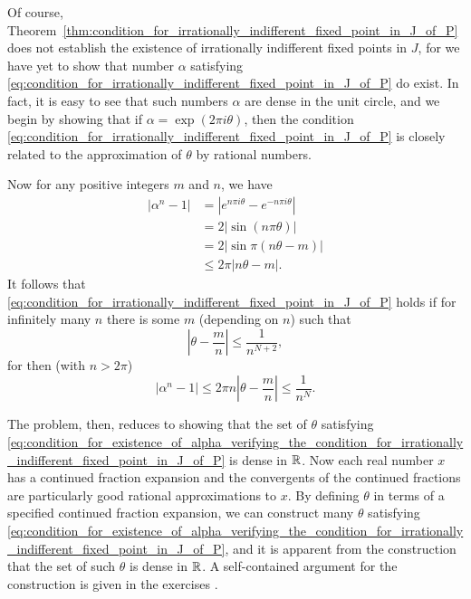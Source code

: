 \begin{remark}
    Of course,
    Theorem~\ref{thm:condition_for_irrationally_indifferent_fixed_point_in_J_of_P}
    does not establish the existence of irrationally indifferent fixed points in
    $J$, for we have yet to show that number $\alpha$ satisfying
    \eqref{eq:condition_for_irrationally_indifferent_fixed_point_in_J_of_P} do
    exist. In fact, it is easy to see that such numbers $\alpha$ are dense in the
    unit circle, and we begin by showing that if $\alpha = \exp(2\pi i \theta)$,
    then the condition
    \eqref{eq:condition_for_irrationally_indifferent_fixed_point_in_J_of_P} is
    closely related to the approximation of $\theta$ by rational numbers.

    Now for any positive integers $m$ and $n$, we have
    \begin{align*}
        |\alpha^n - 1| &= |e^{n\pi i \theta} - e^{-n\pi i \theta}| \\
                    &= 2|\sin(n\pi\theta)| \\
                    &= 2|\sin\pi(n\theta - m)| \\
                    &\leq 2\pi |n\theta - m|.
    \end{align*}
    It follows that
    \eqref{eq:condition_for_irrationally_indifferent_fixed_point_in_J_of_P}
    holds if for infinitely many $n$ there is some $m$ (depending on $n$) such
    that
    \begin{equation}
        \label{eq:condition_for_existence_of_alpha_verifying_the_condition_for_irrationally_indifferent_fixed_point_in_J_of_P}
        \left|\theta - \frac{m}{n}\right| \leq \frac{1}{n^{N+2}},
    \end{equation}
    for then (with $n > 2\pi$)
    \begin{equation*}
        |\alpha^n - 1| \leq 2\pi n \left|\theta - \frac{m}{n}\right| \leq \frac{1}{n^{N}}.
    \end{equation*}

    The problem, then, reduces to showing that the set of $\theta$ satisfying
    \eqref{eq:condition_for_existence_of_alpha_verifying_the_condition_for_irrationally_indifferent_fixed_point_in_J_of_P}
    is dense in $\mathbb{R}$. Now each real number $x$ has a continued fraction
    expansion and the convergents of the continued fractions are particularly
    good rational approximations to $x$. By defining $\theta$ in terms of a
    specified continued fraction expansion, we can construct many $\theta$
    satisfying
    \eqref{eq:condition_for_existence_of_alpha_verifying_the_condition_for_irrationally_indifferent_fixed_point_in_J_of_P},
    and it is apparent from the construction that the set of such $\theta$ is
    dense in $\mathbb{R}$. A self-contained argument for the construction is given in
    the exercises \cite{Beardon1991}.
\end{remark}

